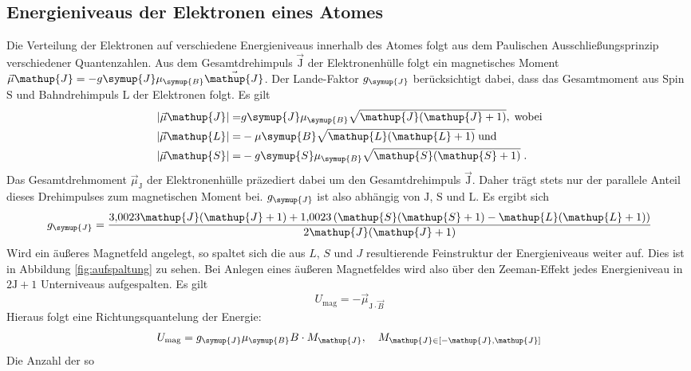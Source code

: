 \documentclass[
  bibliography=totoc,     %
  captions=tableheading,  %
  titlepage=firstiscover, %
]{scrartcl}
\begin{document}
\subsection{Energieniveaus der Elektronen eines Atomes}
%
Die Verteilung der Elektronen auf verschiedene Energieniveaus innerhalb des
Atomes folgt aus dem Paulischen Ausschließungsprinzip verschiedener Quantenzahlen. Aus dem
Gesamtdrehimpuls $\vec{\mathup{J}}$ der Elektronenhülle folgt ein magnetisches Moment
$\vec{\mu}{\mathup{J}}=-g{\symup{J}}\mu_{\symup{B}}\vec{\mathup{J}}$. Der Lande-Faktor $g_{\symup{J}}$
berücksichtigt dabei, dass das Gesamtmoment aus Spin $\mathup{S}$ und Bahndrehimpuls $\mathup{L}$
der Elektronen folgt. Es gilt
%
\begin{align*}
  |\vec{\mu}{\mathup{J}}|=&g{\symup{J}}\mu_{\symup{B}}\sqrt{\mathup{J}(\mathup{J}+1)},\;\text{wobei} \\
  |\vec{\mu}{\mathup{L}}|=&-\mu{\symup{B}}\sqrt{\mathup{L}(\mathup{L}+1)}\;\text{und} \\
  |\vec{\mu}{\mathup{S}}|=&-g{\symup{S}}\mu_{\symup{B}}\sqrt{\mathup{S}(\mathup{S}+1)}\;.
\end{align*}
%
Das Gesamtdrehmoment $\vec{\mu}_{\mathup{J}}$ der Elektronenhülle präzediert dabei um den
Gesamtdrehimpuls $\vec{\mathup{J}}$. Daher trägt stets nur der parallele Anteil dieses
Drehimpulses zum magnetischen Moment bei. $g_{\symup{J}}$ ist also abhängig von
$\mathup{J}$, $\mathup{S}$ und $\mathup{L}$. Es ergibt sich
%
\begin{equation}
  g_{\symup{J}}=\frac{\num{3.0023}\mathup{J}(\mathup{J}+1)+\num{1.0023}\left(\mathup{S}(\mathup{S}+1)-\mathup{L}(\mathup{L}+1)\right)}{2\mathup{J}(\mathup{J}+1)}
  \label{eq:gj}
\end{equation}
%
Wird ein äußeres Magnetfeld angelegt, so spaltet sich die aus $L$, $S$ und $J$
resultierende Feinstruktur der Energieniveaus weiter auf. Dies ist in Abbildung
\ref{fig:aufspaltung} zu sehen. Bei Anlegen eines äußeren Magnetfeldes wird also über den Zeeman-Effekt jedes
Energieniveau in $2\mathup{J}+1$ Unterniveaus aufgespalten. Es gilt
%
\begin{equation}
  U_{\text{mag}}=-\vec{\mu}_{\mathup{J}\cdot\vec{B}}
\end{equation}
%
Hieraus folgt eine Richtungsquantelung der Energie:
%
\begin{equation}
  U_{\text{mag}}=g_{\symup{J}}\mu_{\symup{B}}B\cdot M_{\mathup{J}},\quad M_{\mathup{J}\in[-\mathup{J},\mathup{J}]}
  \label{penis}
\end{equation}
%
Die Anzahl der so
\end{document}
